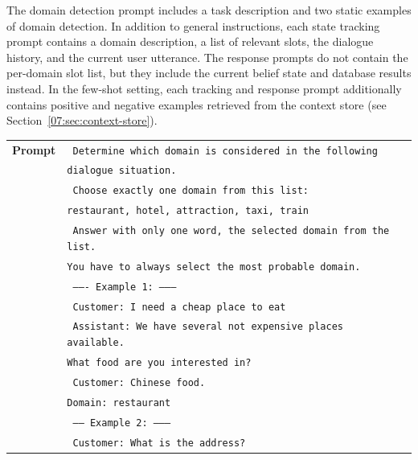 The domain detection prompt includes a task description and two static examples of domain detection.
In addition to general instructions, each state tracking prompt contains a domain description, a list of relevant slots, the dialogue history, and the current user utterance.
The response prompts do not contain the per-domain slot list, but they include the current belief state and database results instead.
In the few-shot setting, each tracking and response prompt additionally contains positive and negative examples retrieved from the context store (see Section~\ref{07:sec:context-store}).

\begin{table}[H]
    \centering\small
    \begin{tabular}{rl}
      \toprule
      \textbf{Prompt} & \texttt{{\color{cyan!80!yellow!80!black!100 } Determine which domain is considered in the following}}\\
      & \texttt{{\color{cyan!80!yellow!80!black!100 }dialogue situation. }}\\
      & \texttt{ {\color{green!100!yellow!70!black!100 } Choose exactly one domain from this list:}}\\
      & \texttt{ {\color{green!100!yellow!70!black!100 }restaurant, hotel, attraction, taxi, train }} \\
      & \texttt{ {\color{cyan!80!yellow!80!black!100 } Answer with only one word, the selected domain from the list. }}\\
      & \texttt{ {\color{cyan!80!yellow!80!black!100 }You have to always select the most probable domain.}} \\
& \texttt{{\color{red!50!yellow!90!black!100!}  ------- Example 1: -------- }} \\
& \texttt{{\color{red!50!yellow!90!black!100!} Customer: I need a cheap place to eat}} \\
&\texttt{ {\color{red!50!yellow!90!black!100!} Assistant: We have several not expensive places available. }} \\
& \texttt{ {\color{red!50!yellow!90!black!100!}What food are you interested in?}} \\
& \texttt{{\color{red!50!yellow!90!black!100!} Customer: Chinese food.}} \\
& \texttt{{\color{red!50!yellow!90!black!100!}Domain: restaurant}} \\
& \texttt{{\color{red!50!yellow!90!black!100!} ------ Example 2: -------- } }\\
& \texttt{{\color{red!50!yellow!90!black!100!} Customer: What is the address?} } \\

\end{tabular}
\end{table}
